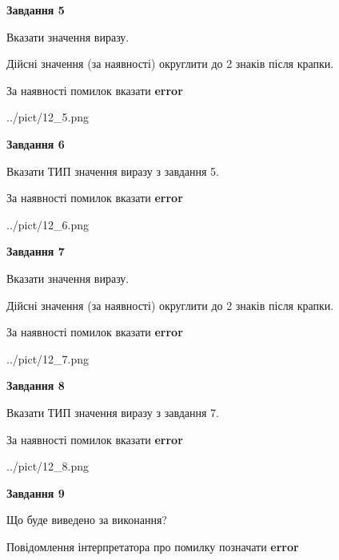 \documentclass[11pt, ukrainian]{article}
\begin{document}
{\begin {large}
{\begin {center}\textbf{Завдання 5}\end {center}}\par
Вказати значення виразу. \par
Дійсні значення (за наявності) округлити до 2 знаків після крапки. \par
За наявності помилок вказати \textbf{error}

\begin{center}
	{../pict/12_5.png}
\end{center}
\newpage

{\begin {center}\textbf{Завдання 6}\end {center}}\par
Вказати ТИП значення виразу з завдання 5. \par
За наявності помилок вказати \textbf{error}

\begin{center}
	{../pict/12_6.png}
\end{center}
\newpage

{\begin {center}\textbf{Завдання 7}\end {center}}\par
Вказати значення виразу. \par
Дійсні значення (за наявності) округлити до 2 знаків після крапки. \par
За наявності помилок вказати \textbf{error}

\begin{center}
	{../pict/12_7.png}
\end{center}
\newpage

{\begin {center}\textbf{Завдання 8}\end {center}}\par
Вказати ТИП значення виразу з завдання 7. \par
За наявності помилок вказати \textbf{error}

\begin{center}
	{../pict/12_8.png}
\end{center}
\newpage

{\begin {center}\textbf{Завдання 9}\end {center}}\par
Що буде виведено за виконання? \par
Повідомлення інтерпретатора про помилку позначати \textbf{error}


\end{large}}
\end{document}
